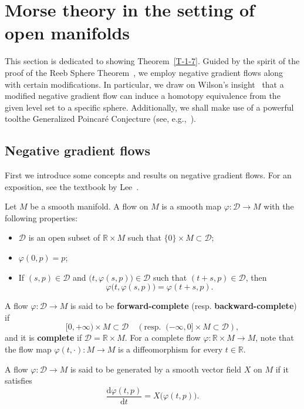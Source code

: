 \documentclass[11pt,letterpaper]{amsart}
\theoremstyle{plain}
\theoremstyle{definition}
\theoremstyle{remark}
\numberwithin{equation}{section}
\begin{document}
\section{Morse theory in the setting of open manifolds}\label{S-2}

This section is dedicated to showing Theorem~\ref{T-1-7}. Guided by the spirit of  the proof of the Reeb Sphere Theorem~\cite{Reeb-1946,Milnor-1964}, we employ negative gradient flows along with certain modifications. In particular, we draw on Wilson's insight~\cite{Wilson-1967} that a modified negative gradient flow can induce a homotopy equivalence from the given level set to a specific sphere. Additionally, we shall make use of a powerful tool\textemdash the Generalized Poincar\'{e} Conjecture (see, e.g.,~\cite{Smale-1961,Freedman-1982,Perelman-2002,Perelman-2003.3,Perelman-2003.7}).


\subsection{Negative gradient flows}

First we introduce some concepts and results on negative gradient flows. For an exposition, see the textbook by Lee~\cite{Lee-2018}.

Let $M$ be a smooth manifold. A flow on $M$ is a smooth map $\varphi:\mathcal D\to M$ with the following properties:
\begin{itemize}
\item[$(1)$]$\mathcal D$ is an open subset of $\mathbb R\times M$ such that $\{0\}\times M\subset \mathcal D$;
\item[$(2)$] $\varphi(0,p)=p$;
\item[$(3)$] If $(s,p)\in\mathcal D$ and $\big(t,\varphi(s,p)\big)\in\mathcal D$ such that $(t+s,p)\in\mathcal D$, then
\[
\varphi\big(t,\varphi(s,p)\big)=\varphi(t+s,p).
\]
\end{itemize}
A flow $\varphi:\mathcal D\to M$ is said to be \textbf{forward-complete} (resp. \textbf{backward-complete}) if
\[
[0,+\infty)\times M\subset \mathcal D\quad \left(\text{resp}.\;\;(-\infty,0]\times M\subset \mathcal D\right),
\]
and it is \textbf{complete} if $\mathcal D=\mathbb R\times M$. For a complete flow $\varphi:\mathbb R\times M\to M$, note that the flow map $\varphi(t,\cdot):M\to M$ is a diffeomorphism for every $t\in \mathbb R$.

A flow $\varphi:\mathcal D\to M$ is said to be generated by a smooth vector field $X$ on $M$ if it satisfies
\[
\frac{\mathrm{d}\varphi(t,p)}{\mathrm{d}t}
=X\big(\varphi(t,p)\big).
\]
\end{document}
